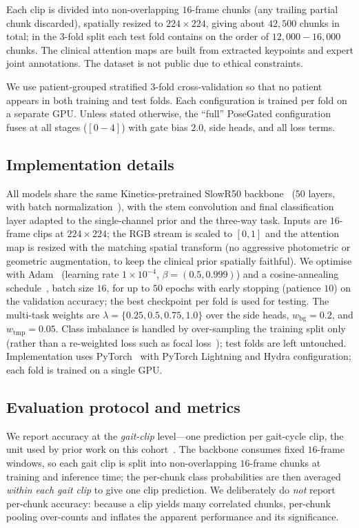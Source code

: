 \documentclass[review,authoryear,times]{elsarticle}
\begin{document}
Each clip is divided into non-overlapping $16$-frame chunks (any trailing partial chunk discarded), spatially resized to
$224\times224$, giving about $42{,}500$ chunks in total; in the 3-fold split each
test fold contains on the order of $12{,}000\!-\!16{,}000$ chunks. The clinical attention maps are built
from extracted keypoints and expert joint annotations. The dataset is not public
due to ethical constraints.

We use patient-grouped stratified 3-fold cross-validation so that no patient appears in both training and test folds. 
Each configuration is trained per fold on a separate GPU. Unless stated otherwise, the ``full'' PoseGated configuration fuses
at all stages ($[0\!-\!4]$) with gate bias $2.0$, side heads, and all loss terms.

\subsection{Implementation details}
All models share the same {Kinetics}-pretrained {SlowR50}
backbone~\citep{feichtenhofer2019slowfast} ($50$ layers, with batch
normalization~\citealp{ioffe2015batchnorm}), with the stem convolution and final
classification layer adapted to the single-channel prior and the three-way task. Inputs are $16$-frame clips at $224\times224$; the RGB
stream is scaled to $[0,1]$ and the attention map is resized with the matching
spatial transform (no aggressive photometric or geometric augmentation, to keep
the clinical prior spatially faithful). We optimise with
{Adam}~\citep{kingma2015adam} (learning rate $1\!\times\!10^{-4}$,
$\beta=(0.5,0.999)$) and a cosine-annealing
schedule~\citep{loshchilov2017sgdr}, batch size $16$, for up to $50$ epochs with
early stopping (patience $10$) on the validation accuracy; the best checkpoint per
fold is used for testing. The multi-task weights are
$\lambda=\{0.25,0.5,0.75,1.0\}$ over the side heads, $w_{\mathrm{bg}}{=}0.2$, and
$w_{\mathrm{tmp}}{=}0.05$. Class imbalance is handled by over-sampling the
training split only (rather than a re-weighted loss such as focal
loss~\citep{lin2017focal}); test folds are left untouched. Implementation uses
{PyTorch}~\citep{paszke2019pytorch} with {PyTorch Lightning} and {Hydra}
configuration; each fold is trained on a single GPU.

\subsection{Evaluation protocol and metrics}
\label{sec:protocol}
We report accuracy at the \emph{gait-clip} level---one prediction per gait-cycle
clip, the unit used by prior work on this cohort~\citep{chen2023two,chen2024phasemix}.
The backbone consumes fixed $16$-frame windows, so each gait clip is split into
non-overlapping $16$-frame chunks at training and inference time; the per-chunk
class probabilities are then averaged \emph{within each gait clip} to give one
clip prediction. We deliberately do \emph{not} report per-chunk accuracy: because
a clip yields many correlated chunks, per-chunk pooling over-counts and inflates
the apparent performance and its significance.
\end{document}
